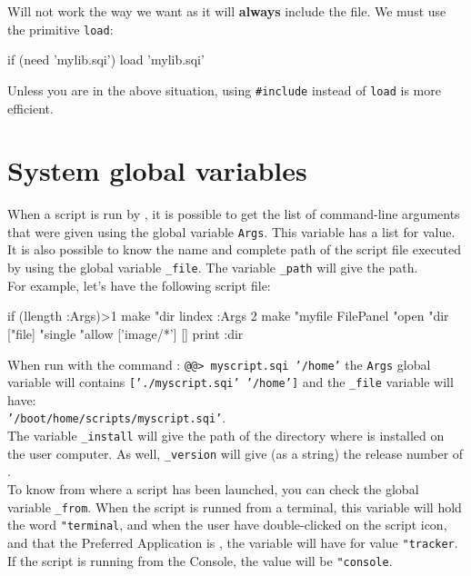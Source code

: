 Will not work the way we want as it will {\bf always} include the file. We must use the primitive {\tt load}:

\begin{verbatimtab}
if (need 'mylib.sqi') { 
	load 'mylib.sqi'
}
\end{verbatimtab}

Unless you are in the above situation, using {\tt \verb+#+include} instead of {\tt load} is more efficient.

\section{System global variables}
 
When a script is run by \squirrel, it is possible to get the list of command-line arguments that were given using the global variable {\tt Args}. This variable has a list for value. It is also possible to know the name and complete path of the script file executed by using the global variable {\tt \verb+_+file}. The variable {\tt \verb+_+path} will give the path.\\

For example, let's have the following script file:
\begin{verbatimtab}
if (llength :Args)>1 {
 make "dir lindex :Args 2
 make "myfile FilePanel "open "dir ["file] "single "allow ['image/*'] []
 print :dir
}
\end{verbatimtab}

When run with the command : {\tt @@> myscript.sqi '/home'} the {\tt Args} global variable will contains {\tt ['./myscript.sqi' '/home']} and the {\tt \verb+_+file} variable will have:\\ 
{\tt '/boot/home/scripts/myscript.sqi'}.\\

The variable {\tt \verb+_+install} will give the path of the directory where \squirrel is installed on the user computer. As well, {\tt \verb+_+version} will give (as a string) the release number of \squirrel.\\

To know from where a \squirrel script has been launched, you can check the global variable {\tt \verb+_+from}. When the script is runned from a terminal, this variable will hold the word {\tt "terminal}, and when the user have double-clicked on the script icon, and that the Preferred Application is \squirrel, the variable will have for value {\tt "tracker}. If
the script is running from the \squirrel Console, the value will be {\tt "console}.

